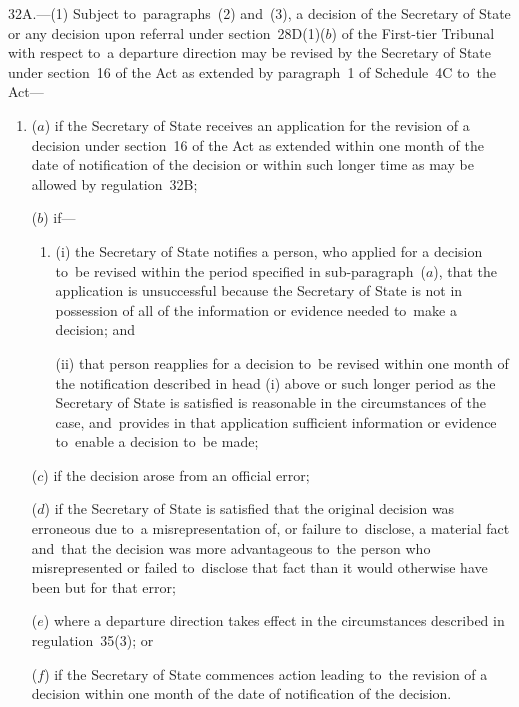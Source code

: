 \documentclass[12pt,a4paper]{article}
\begin{document}
32A.—(1) Subject to~paragraphs~(2) and~(3), a decision of the Secretary of State or any decision upon referral under section~28D(1)($b$) of 
the First-tier Tribunal  %
with respect to~a departure direction may be revised by the Secretary of State under section~16 of the Act as extended by paragraph~1 of Schedule~4C to~the Act---
\begin{enumerate}\item[]
($a$) if the Secretary of State receives an application for the revision of a decision under section~16 of the Act as extended within one month of the date of notification of the decision or within such longer time as may be allowed by regulation~32B;

($b$) if---
\begin{enumerate}\item[]
(i) the Secretary of State notifies a person, who applied for a decision to~be revised within the period specified in sub-paragraph~($a$), that the application is unsuccessful because the Secretary of State is not in possession of all of the information or evidence needed to~make a decision; and

(ii) that person reapplies for a decision to~be revised within one month of the notification described in head (i) above or such longer period as the Secretary of State is satisfied is reasonable in the circumstances of the case, and~provides in that application sufficient information or evidence to~enable a decision to~be made;
\end{enumerate}

($c$) if the decision arose from an official error;

($d$) if the Secretary of State is satisfied that the original decision was erroneous due to~a misrepresentation of, or failure to~disclose, a material fact and~that the decision was more advantageous to~the person who misrepresented or failed to~disclose that fact than it would otherwise have been but for that error;

($e$) where a departure direction takes effect in the circumstances described in regulation~35(3); or

($f$) if the Secretary of State commences action leading to~the revision of a decision within one month of the date of notification of the decision.
\end{enumerate}
\end{document}
